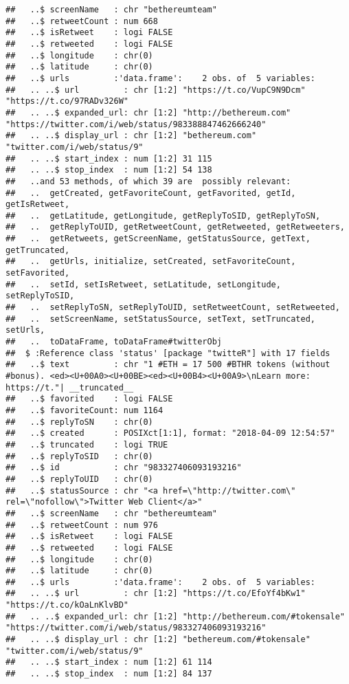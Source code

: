 \documentclass[]{article}
\begin{document}
\begin{verbatim}
##   ..$ screenName   : chr "bethereumteam"
##   ..$ retweetCount : num 668
##   ..$ isRetweet    : logi FALSE
##   ..$ retweeted    : logi FALSE
##   ..$ longitude    : chr(0) 
##   ..$ latitude     : chr(0) 
##   ..$ urls         :'data.frame':    2 obs. of  5 variables:
##   .. ..$ url         : chr [1:2] "https://t.co/VupC9N9Dcm" "https://t.co/97RADv326W"
##   .. ..$ expanded_url: chr [1:2] "http://bethereum.com" "https://twitter.com/i/web/status/983388847462666240"
##   .. ..$ display_url : chr [1:2] "bethereum.com" "twitter.com/i/web/status/9"
##   .. ..$ start_index : num [1:2] 31 115
##   .. ..$ stop_index  : num [1:2] 54 138
##   ..and 53 methods, of which 39 are  possibly relevant:
##   ..  getCreated, getFavoriteCount, getFavorited, getId, getIsRetweet,
##   ..  getLatitude, getLongitude, getReplyToSID, getReplyToSN,
##   ..  getReplyToUID, getRetweetCount, getRetweeted, getRetweeters,
##   ..  getRetweets, getScreenName, getStatusSource, getText, getTruncated,
##   ..  getUrls, initialize, setCreated, setFavoriteCount, setFavorited,
##   ..  setId, setIsRetweet, setLatitude, setLongitude, setReplyToSID,
##   ..  setReplyToSN, setReplyToUID, setRetweetCount, setRetweeted,
##   ..  setScreenName, setStatusSource, setText, setTruncated, setUrls,
##   ..  toDataFrame, toDataFrame#twitterObj
##  $ :Reference class 'status' [package "twitteR"] with 17 fields
##   ..$ text         : chr "1 #ETH = 17 500 #BTHR tokens (without #bonus). <ed><U+00A0><U+00BE><ed><U+00B4><U+00A9>\nLearn more: https://t."| __truncated__
##   ..$ favorited    : logi FALSE
##   ..$ favoriteCount: num 1164
##   ..$ replyToSN    : chr(0) 
##   ..$ created      : POSIXct[1:1], format: "2018-04-09 12:54:57"
##   ..$ truncated    : logi TRUE
##   ..$ replyToSID   : chr(0) 
##   ..$ id           : chr "983327406093193216"
##   ..$ replyToUID   : chr(0) 
##   ..$ statusSource : chr "<a href=\"http://twitter.com\" rel=\"nofollow\">Twitter Web Client</a>"
##   ..$ screenName   : chr "bethereumteam"
##   ..$ retweetCount : num 976
##   ..$ isRetweet    : logi FALSE
##   ..$ retweeted    : logi FALSE
##   ..$ longitude    : chr(0) 
##   ..$ latitude     : chr(0) 
##   ..$ urls         :'data.frame':    2 obs. of  5 variables:
##   .. ..$ url         : chr [1:2] "https://t.co/EfoYf4bKw1" "https://t.co/kOaLnKlvBD"
##   .. ..$ expanded_url: chr [1:2] "http://bethereum.com/#tokensale" "https://twitter.com/i/web/status/983327406093193216"
##   .. ..$ display_url : chr [1:2] "bethereum.com/#tokensale" "twitter.com/i/web/status/9"
##   .. ..$ start_index : num [1:2] 61 114
##   .. ..$ stop_index  : num [1:2] 84 137

\end{verbatim}
\end{document}
